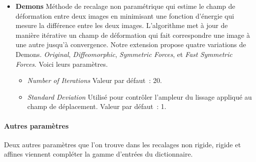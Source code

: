 \documentclass{article}
\newcommand{\subsubsubsection}[1]{\paragraph{#1}\par\noindent\bigskip}
\begin{document}
{{\begin{itemize}
            \begin{itemize}
                \item \textit{Transform Domain Mesh Size} Nombre de points de contrôle utilisés pour définir la transformation B-Spline. Plus il est grand, plus le recalage sera précis mais long. Valeur par défaut~: 2.

                \item \textit{Scale Factor} Utilisé pour mettre à l'échelle la grille de points de contrôle B-Spline à chaque niveau de résolution. Valeur par défaut~: [1, 2, 4]. (Il ne peut pas être utilisé avec l'optimiseur LBFGSB, et devient inactif si sélectionné.)

                \item \textit{Shrink Factor} Utilisé pour déterminer la taille de l'image à chaque niveau de résolution. Valeur par défaut~: [4, 2, 1].

                \item \textit{Smoothing Sigmas} Utilisés pour lisser les images à chaque niveau de résolution. Valeur par défaut~: [2, 1, 0].
            \end{itemize}

            \item \textbf{Demons} Méthode de recalage non paramétrique qui estime le champ de déformation entre deux images en minimisant une fonction d'énergie qui mesure la différence entre les deux images. L'algorithme met à jour de manière itérative un champ de déformation qui fait correspondre une image à une autre jusqu'à convergence. Notre extension propose quatre variations de Demons. \textit{Original}, \textit{Diffeomorphic}, \textit{Symmetric Forces}, et \textit{Fast Symmetric Forces}. Voici leurs paramètres.

            \begin{itemize}
                \item \textit{Number of Iterations} Valeur par défaut~: 20.

                \item \textit{Standard Deviation} Utilisé pour contrôler l'ampleur du lissage appliqué au champ de déplacement. Valeur par défaut~: 1.
            \end{itemize}
        \end{itemize}

        \bigskip
        \subsubsubsection{Autres paramètres}

        Deux autres paramètres que l'on trouve dans les recalages non rigide, rigide et affines viennent compléter la gamme d'entrées du dictionnaire.

}}
\end{document}
